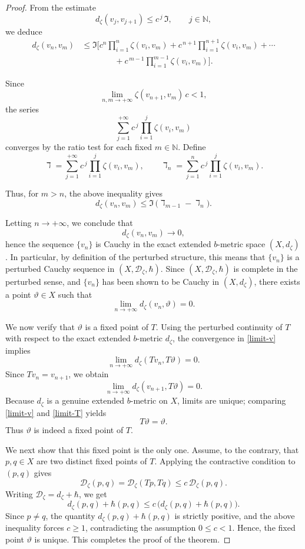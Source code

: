 \documentclass[10pt,a4paper]{amsart}
\begin{document}
\begin{proof}
From the estimate
\[
d_{\zeta}(v_j , v_{j+1}) \le c^{\,j}\,\Im, \qquad j\in\mathbb{N},
\]
we deduce
\[
\begin{aligned}
d_{\zeta}(v_n , v_m)
&\le \Im \Big[
c^{n}\prod_{i=1}^{n}\zeta(v_i,v_m)
+ c^{\,n+1}\prod_{i=1}^{n+1}\zeta(v_i,v_m)
+ \cdots  \\
&\qquad\qquad 
+ c^{\,m-1}\prod_{i=1}^{m-1}\zeta(v_i,v_m)
\Big].
\end{aligned}
\]

Since 
\[
\lim_{n,m\to+\infty} \zeta(v_{n+1},v_m)\,c < 1,
\]
the series
\[
\sum_{j=1}^{+\infty} c^{\,j}\prod_{i=1}^{j}\zeta(v_i,v_m)
\]
converges by the ratio test for each fixed $m\in\mathbb{N}$.  
Define
\[
\daleth=\sum_{j=1}^{+\infty} c^{\,j}\prod_{i=1}^{j}\zeta(v_i,v_m),
\qquad
\daleth_n=\sum_{j=1}^{n} c^{\,j}\prod_{i=1}^{j}\zeta(v_i,v_m).
\]

Thus, for $m>n$, the above inequality gives
\[
d_{\zeta}(v_n , v_m)
\le \Im\,\big(\daleth_{m-1}-\daleth_n\big).
\]

Letting $n\to+\infty$, we conclude that 
\[
d_{\zeta}(v_n,v_m)\longrightarrow 0,
\]
hence the sequence $\{v_n\}$ is Cauchy in the exact extended $b$-metric space $(X,d_{\zeta})$. In particular, by definition of the perturbed structure, this means that $\{v_n\}$ is a perturbed Cauchy sequence in $(X,\mathcal{D}_{\zeta},\hbar)$. Since $(X,\mathcal{D}_{\zeta},\hbar)$ is complete in the perturbed sense, and 
$\{v_n\}$ has been shown to be Cauchy in $(X,d_{\zeta})$, there exists a point 
$\vartheta \in X$ such that
\begin{equation}\label{limit-v}
\lim_{n \to +\infty} d_{\zeta}(v_n,\vartheta)=0.
\end{equation}

\medskip
We now verify that $\vartheta$ is a fixed point of $T$.  
Using the perturbed continuity of $T$ with respect to the exact extended $b$-metric $d_{\zeta}$, 
the convergence in \eqref{limit-v} implies
\[
\lim_{n\to+\infty} d_{\zeta}(T v_n, T\vartheta)=0.
\]
Since $T v_n = v_{n+1}$, we obtain
\begin{equation}\label{limit-T}
\lim_{n\to+\infty} d_{\zeta}(v_{n+1}, T\vartheta)=0.
\end{equation}
Because $d_{\zeta}$ is a genuine extended $b$-metric on $X$, limits are unique; 
comparing \eqref{limit-v} and \eqref{limit-T} yields
\[
T\vartheta = \vartheta.
\]
Thus $\vartheta$ is indeed a fixed point of $T$.

\medskip
We next show that this fixed point is the only one.  
Assume, to the contrary, that $p,q\in X$ are two distinct fixed points of $T$.  
Applying the contractive condition to $(p,q)$ gives
\[
\mathcal{D}_{\zeta}(p,q)
= \mathcal{D}_{\zeta}(Tp,Tq)
\le c\, \mathcal{D}_{\zeta}(p,q).
\]
Writing $\mathcal{D}_{\zeta}=d_{\zeta}+\hbar$, we get
\[
d_{\zeta}(p,q)+\hbar(p,q)
\le c\,\big( d_{\zeta}(p,q)+\hbar(p,q) \big).
\]
Since $p\neq q$, the quantity $d_{\zeta}(p,q)+\hbar(p,q)$ is strictly positive, and 
the above inequality forces $c\ge 1$, contradicting the assumption $0\le c<1$.
Hence, the fixed point $\vartheta$ is unique. This completes the proof of the theorem.
\end{proof}
\end{document}
